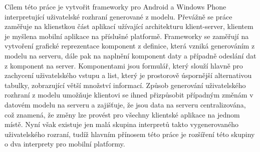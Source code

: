 \documentclass[11pt,twoside,a4paper]{book}
\begin{document}
	\noindent
	Cílem této práce je vytvořit frameworky pro Android a Windows Phone interpretující uživatelské rozhraní generované z modelu. Převážně se práce zaměřuje na klienstkou část aplikací užívající architekturu klient-server, klientem je myšlena mobilní aplikace na příslušné platformě. Frameworky se zaměřují na vytvoření grafické reprezentace komponent z definice, která vzniká generováním z modelu na serveru, dále pak na naplnění komponent daty a případně odeslání dat z komponent na server. Komponentami jsou formulář, který slouží hlavně pro zachycení uživatelského vstupu a list, který je prostorově úspornější alternativou tabulky, zobrazující větší množství informací. Způsob generování uživatelského rozhraní z modelu umožňuje klientovi se ihned přizpůsobit případným změnám v datovém modelu na serveru a zajišťuje, že jsou data na serveru centralizována, což znamená, že změny lze provést pro všechny klientské aplikace na jednom místě. Nyní však existuje jen malá skupina interpretů takto vygenerovaného uživatelského rozraní, tudíž hlavním přínosem této práce je rozšíření této skupiny o dva interprety pro mobilní platformy.
	\noindent

	\tableofcontents		%

	\listoffigures			%
	\listoftables			%

	\mainbodystarts

% 
% 








\end{document}
